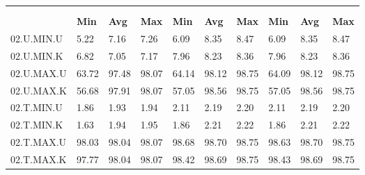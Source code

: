 \begin{tabular}{|>{\raggedright}p{}|>{\raggedright}p{}|>{\raggedright}p{}|>{\raggedright}p{}|>{\raggedright}p{}|>{\raggedright}p{}|>{\raggedright}p{}|>{\raggedright}p{}|>{\raggedright}p{}|>{\raggedright}p{}|}
\hline 
\multirow{3}{0.12\columnwidth}{\textbf{\footnotesize{}Bezeichnung}} & \multicolumn{9}{l|}{\textbf{\footnotesize{}RX-Bitrate {[}MBit/s{]}}}\tabularnewline
\cline{2-10} 
& \multicolumn{3}{l|}{\textbf{\footnotesize{}prp1}} & \multicolumn{3}{l|}{\textbf{\footnotesize{}eth0}} & \multicolumn{3}{l|}{\textbf{\footnotesize{}eth1}}\tabularnewline
\cline{2-10} 
& \textbf{\footnotesize{}Min} & \textbf{\footnotesize{}Avg} & \textbf{\footnotesize{}Max} & \textbf{\footnotesize{}Min} & \textbf{\footnotesize{}Avg} & \textbf{\footnotesize{}Max} & \textbf{\footnotesize{}Min} & \textbf{\footnotesize{}Avg} & \textbf{\footnotesize{}Max}\tabularnewline
\hline 
\hline 
{\footnotesize{}02.U.MIN.U} & {\footnotesize{}5.22} & {\footnotesize{}7.16} & {\footnotesize{}7.26} & {\footnotesize{}6.09} & {\footnotesize{}8.35} & {\footnotesize{}8.47} & {\footnotesize{}6.09} & {\footnotesize{}8.35} & {\footnotesize{}8.47}\tabularnewline
\hline 
\hline 
{\footnotesize{}02.U.MIN.K} & {\footnotesize{}6.82} & {\footnotesize{}7.05} & {\footnotesize{}7.17} & {\footnotesize{}7.96} & {\footnotesize{}8.23} & {\footnotesize{}8.36} & {\footnotesize{}7.96} & {\footnotesize{}8.23} & {\footnotesize{}8.36}\tabularnewline
\hline 
\hline 
{\footnotesize{}02.U.MAX.U} & {\footnotesize{}63.72} & {\footnotesize{}97.48} & {\footnotesize{}98.07} & {\footnotesize{}64.14} & {\footnotesize{}98.12} & {\footnotesize{}98.75} & {\footnotesize{}64.09} & {\footnotesize{}98.12} & {\footnotesize{}98.75}\tabularnewline
\hline 
\hline 
{\footnotesize{}02.U.MAX.K} & {\footnotesize{}56.68} & {\footnotesize{}97.91} & {\footnotesize{}98.07} & {\footnotesize{}57.05} & {\footnotesize{}98.56} & {\footnotesize{}98.75} & {\footnotesize{}57.05} & {\footnotesize{}98.56} & {\footnotesize{}98.75}\tabularnewline
\hline 
\hline 
{\footnotesize{}02.T.MIN.U} & {\footnotesize{}1.86} & {\footnotesize{}1.93} & {\footnotesize{}1.94} & {\footnotesize{}2.11} & {\footnotesize{}2.19} & {\footnotesize{}2.20} & {\footnotesize{}2.11} & {\footnotesize{}2.19} & {\footnotesize{}2.20}\tabularnewline
\hline 
\hline 
{\footnotesize{}02.T.MIN.K} & {\footnotesize{}1.63} & {\footnotesize{}1.94} & {\footnotesize{}1.95} & {\footnotesize{}1.86} & {\footnotesize{}2.21} & {\footnotesize{}2.22} & {\footnotesize{}1.86} & {\footnotesize{}2.21} & {\footnotesize{}2.22}\tabularnewline
\hline 
\hline 
{\footnotesize{}02.T.MAX.U} & {\footnotesize{}98.03} & {\footnotesize{}98.04} & {\footnotesize{}98.07} & {\footnotesize{}98.68} & {\footnotesize{}98.70} & {\footnotesize{}98.75} & {\footnotesize{}98.63} & {\footnotesize{}98.70} & {\footnotesize{}98.75}\tabularnewline
\hline 
\hline 
{\footnotesize{}02.T.MAX.K} & {\footnotesize{}97.77} & {\footnotesize{}98.04} & {\footnotesize{}98.07} & {\footnotesize{}98.42} & {\footnotesize{}98.69} & {\footnotesize{}98.75} & {\footnotesize{}98.43} & {\footnotesize{}98.69} & {\footnotesize{}98.75}\tabularnewline
\hline 
\end{tabular}
\par
